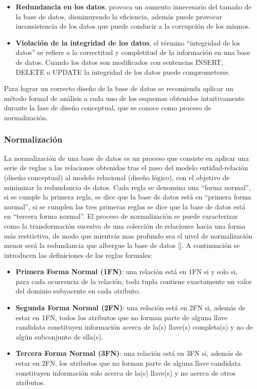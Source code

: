 \begin{itemize}
    \item \textbf{Redundancia en los datos}, provoca un aumento innecesario 
    del tamaño de la base de datos, disminuyendo la eficiencia, además puede provocar 
    inconsistencia de los datos que puede conducir a la corrupción de los mismos. 
    \item \textbf{Violación de la integridad de los datos}, el término ``integridad de los datos'' se 
    refiere a la correctitud y completitud de la información en una base de datos. Cuando los datos son 
    modificados con sentencias INSERT, DELETE o UPDATE la integridad de los datos puede comprometerse.
\end{itemize}



Para lograr un correcto diseño de la base de datos se recomienda aplicar un método formal de 
análisis a cada uno de los esquemas obtenidos intuitivamente durante la fase de diseño conceptual, 
que se conoce como proceso de normalización.

\subsubsection{Normalización}
La normalización de una base de datos es un proceso que consiste 
en aplicar una serie de reglas a las relaciones obtenidas 
tras el paso del modelo entidad-relación (diseño conceptual) al modelo 
relacional (diseño lógico), con el objetivo de minimizar la redundancia de datos.
Cada regla se denomina una ``forma normal'', si se cumple la primera regla, se dice que 
la base de datos está en ``primera forma normal'', si se cumplen las tres 
primeras reglas se dice que la base de datos está en ``tercera forma normal''. El proceso de 
normalización se puede caracterizar como la transformación sucesiva de una colección de 
relaciones hacia una forma más restrictiva, de modo que mientrás mas profundo sea el nivel 
de normalización menor será la redundancia que albergue la base de datos [\cite{db_book_cap4}].
A continuación se introducen las definiciones de las reglas formales:

\begin{itemize}
    \item \textbf{Primera Forma Normal (1FN)}: una relación está en 1FN si y solo si, para 
    cada ocurrencia de la relación, toda tupla contiene exactamente un valor del dominio subyacente en
    cada atributo.
    \item \textbf{Segunda Forma Normal (2FN)}: una relación está en 2FN si, además de estar en 
    1FN, todos los atributos que no forman parte de alguna llave candidata constituyen información 
    acerca de la(s) llave(s) completa(s) y no de algún subconjunto de ella(s).
    \item \textbf{Tercera Forma Normal (3FN)}: una relación está en 3FN si, además de estar en 2FN,
    los atributos que no forman parte de alguna llave candidata constituyen información solo acerca
    de la(s) llave(s) y no acerca de otros atributos.
\end{itemize}


